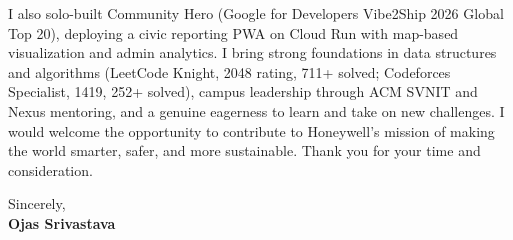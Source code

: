\documentclass[a4paper,11pt]{article}
\begin{document}
I also solo-built Community Hero (Google for Developers Vibe2Ship 2026 Global Top 20), deploying a civic reporting PWA on Cloud Run with map-based visualization and admin analytics. I bring strong foundations in data structures and algorithms (LeetCode Knight, 2048 rating, 711+ solved; Codeforces Specialist, 1419, 252+ solved), campus leadership through ACM SVNIT and Nexus mentoring, and a genuine eagerness to learn and take on new challenges. I would welcome the opportunity to contribute to Honeywell's mission of making the world smarter, safer, and more sustainable. Thank you for your time and consideration.

Sincerely, \\
\vspace{8mm}
\textbf{Ojas Srivastava}
\end{document}
